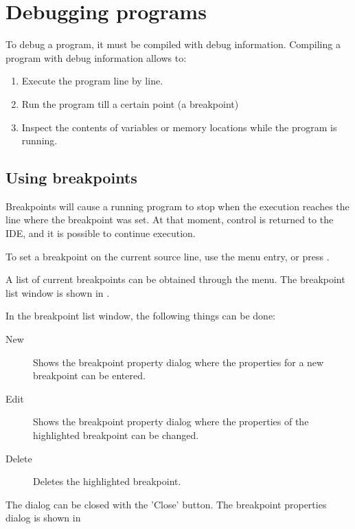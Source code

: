 \section{Debugging programs}
\label{se:debugging}
To debug a program, it must be compiled with debug information. Compiling a
program with debug information allows to:
\begin{enumerate}
\item Execute the program line by line.
\item Run the program till a certain point (a breakpoint)
\item Inspect the contents of variables or memory locations while the
program is running.
\end{enumerate}
%
%
\subsection{Using breakpoints}
Breakpoints will cause a running program to stop when the execution
reaches the line where the breakpoint was set. At that moment, control
is returned to the IDE, and it is possible to continue execution.

To set a breakpoint on the current source line, use the
 menu entry, or press .

A list of current breakpoints can be obtained through the
 menu. The breakpoint list window
is shown in .


In the breakpoint list window, the following things can be done:
\begin{description}
\item[New] Shows the breakpoint property dialog where the properties
for a new breakpoint can be entered.
\item[Edit] Shows the breakpoint property dialog where the properties of
the highlighted breakpoint can be changed.
\item[Delete] Deletes the highlighted breakpoint.
\end{description}
The dialog can be closed with the 'Close' button.
The breakpoint properties dialog is shown in 



